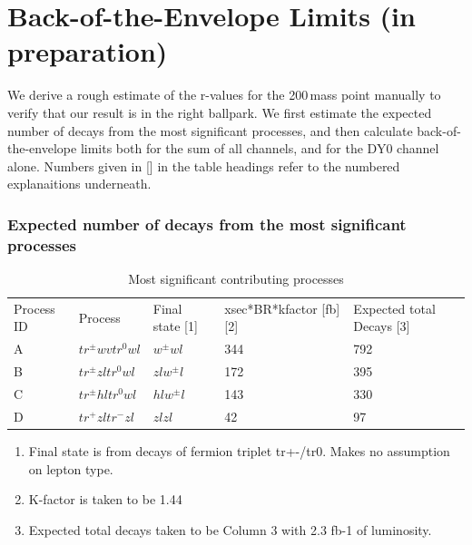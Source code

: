 \chapter{Back-of-the-Envelope Limits (in preparation)}

We derive a rough estimate of the r-values for the 200\,\GeV mass point manually to verify that our result is in the right ballpark. We first estimate the expected number of decays from the most significant processes, and then calculate back-of-the-envelope limits both for the sum of all channels, and for the DY0 channel alone. Numbers given in [] in the table headings refer to the numbered explanaitions underneath.

\subsection*{Expected number of decays from the most significant processes}

\begin{table}[h!]
\centering
\caption{Most significant contributing processes} %
\begin{tabular}{lllll}
Process ID & Process                                         & Final state [1] & xsec*BR*kfactor [fb] [2] & Expected total Decays [3] \\
A          & $tr^\pm wvtr^0wl$ & $w^\pm w l$             & 344                              & 792                           \\
B          & $tr^\pm zltr^0wl$ & $z l w^\pm l$           & 172                              & 395                           \\
C          & $tr^\pm hltr^0wl$ & $h l w^\pm l$           & 143                              & 330                           \\
D          & $tr^+zltr^- zl$  & $z l z l$             & 42                               & 97                           
\end{tabular}
\end{table}

\begin{enumerate}
	\item Final state is from decays of fermion triplet tr+-/tr0. Makes no assumption on lepton type.
	\item K-factor is taken to be 1.44
	\item Expected total decays taken to be Column 3 with 2.3 fb-1 of luminosity.
\end{enumerate}



